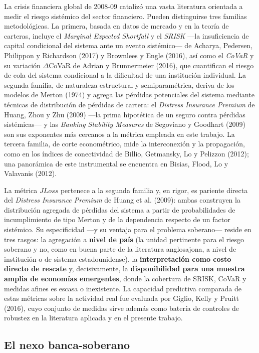 \documentclass[5p,times,twocolumn,authoryear]{elsarticle}
\begin{document}
La crisis financiera global de 2008-09 catalizó una vasta literatura orientada a medir el riesgo sistémico del sector financiero. Pueden distinguirse tres familias metodológicas. La primera, basada en datos de mercado y en la teoría de carteras, incluye el \textit{Marginal Expected Shortfall} y el \textit{SRISK} —la insuficiencia de capital condicional del sistema ante un evento sistémico— de Acharya, Pedersen, Philippon y Richardson (2017) y Brownlees y Engle (2016), así como el \textit{CoVaR} y su variación $\Delta$CoVaR de Adrian y Brunnermeier (2016), que cuantifican el riesgo de cola del sistema condicional a la dificultad de una institución individual. La segunda familia, de naturaleza estructural y semiparamétrica, deriva de los modelos de Merton (1974) y agrega las pérdidas potenciales del sistema mediante técnicas de distribución de pérdidas de cartera: el \textit{Distress Insurance Premium} de Huang, Zhou y Zhu (2009) —la prima hipotética de un seguro contra pérdidas sistémicas— y las \textit{Banking Stability Measures} de Segoviano y Goodhart (2009) son sus exponentes más cercanos a la métrica empleada en este trabajo. La tercera familia, de corte econométrico, mide la interconexión y la propagación, como en los índices de conectividad de Billio, Getmansky, Lo y Pelizzon (2012); una panorámica de este instrumental se encuentra en Bisias, Flood, Lo y Valavanis (2012).

La métrica $JLoss$ pertenece a la segunda familia y, en rigor, es pariente directa del \textit{Distress Insurance Premium} de Huang et al. (2009): ambas construyen la distribución agregada de pérdidas del sistema a partir de probabilidades de incumplimiento de tipo Merton y de la dependencia respecto de un factor sistémico. Su especificidad —y su ventaja para el problema soberano— reside en tres rasgos: la agregación a \textbf{nivel de país} (la unidad pertinente para el riesgo soberano y no, como en buena parte de la literatura anglosajona, a nivel de institución o de sistema estadounidense), la \textbf{interpretación como costo directo de rescate} y, decisivamente, la \textbf{disponibilidad para una muestra amplia de economías emergentes}, donde la cobertura de SRISK, CoVaR y medidas afines es escasa o inexistente. La capacidad predictiva comparada de estas métricas sobre la actividad real fue evaluada por Giglio, Kelly y Pruitt (2016), cuyo conjunto de medidas sirve además como batería de controles de robustez en la literatura aplicada y en el presente trabajo.

\subsection{El nexo banca-soberano}
\end{document}
